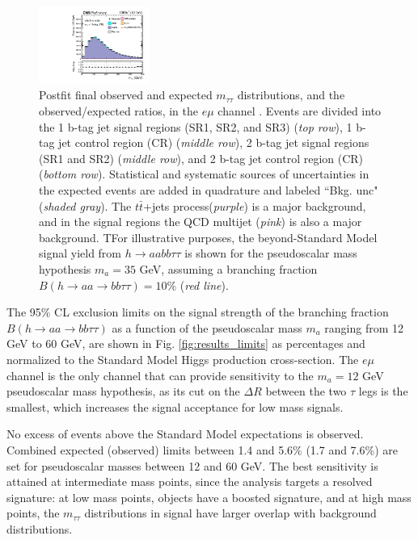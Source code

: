 \begin{figure}[ht]
\begin{center}
        \includegraphics[width=0.32\textwidth]{figures/ch-10-results/em_all_7_post_prelim-yes.pdf}
    \end{center}
    \caption[Postfit final observed and expected $m_{\tau\tau}$ distributions in the $e\mu$ channel.]{Postfit final observed and expected $m_{\tau\tau}$ distributions, and the observed/expected ratios, in the $e\mu$ channel \cite{CMS-AN-20-213}. Events are divided into the 1 b-tag jet signal regions (SR1, SR2, and SR3) (\textit{top row}), 1 b-tag jet control region (CR) (\textit{middle row}), 2 b-tag jet signal regions (SR1 and SR2) (\textit{middle row}), and 2 b-tag jet control region (CR) (\textit{bottom row}). Statistical and systematic sources of uncertainties in the expected events are added in quadrature and labeled ``Bkg. unc" (\textit{shaded gray}). The $t\bar{t}$+jets process(\textit{purple}) is a major background, and in the signal regions the QCD multijet (\textit{pink}) is also a major background. TFor illustrative purposes, the beyond-Standard Model signal yield from $h\rightarrow aa bb\tau\tau$ is shown for the pseudoscalar mass hypothesis $m_a = 35$ GeV, assuming a branching fraction $B(h \rightarrow aa \rightarrow bb\tau\tau) = 10\%$ (\textit{red line}).}
    \label{fig:results_mtt_postfit_emall}
\end{figure}


The 95\% CL exclusion limits on the signal strength of the branching fraction $B(h \rightarrow aa \rightarrow bb\tau\tau)$ as a function of the pseudoscalar mass $m_a$ ranging from 12 GeV to 60 GeV, are shown in Fig. \ref{fig:results_limits} as percentages and normalized to the Standard Model Higgs production cross-section. The $e\mu$ channel is the only channel that can provide sensitivity to the $m_a = 12$ GeV pseudoscalar mass hypothesis, as its cut on the $\Delta R$ between the two $\tau$ legs is the smallest, which increases the signal acceptance for low mass signals.

No excess of events above the Standard Model expectations is observed. Combined expected (observed) limits between 1.4 and 5.6\% (1.7 and 7.6\%) are set for pseudoscalar masses between 12 and 60 GeV. The best sensitivity is attained at intermediate mass points, since the analysis targets a resolved signature: at low mass points, objects have a boosted signature, and at high mass points, the $m_{\tau\tau}$ distributions in signal have larger overlap with background distributions.

